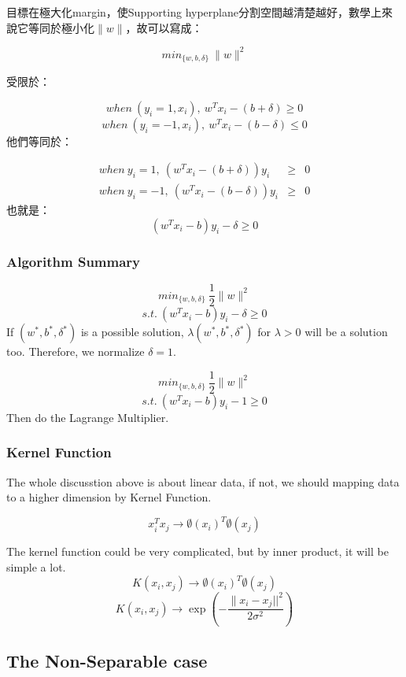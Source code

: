 \documentclass[]{book}
\begin{document}
目標在極大化margin，使Supporting hyperplane分割空間越清楚越好，數學上來說它等同於極小化\(\|w\|\)，故可以寫成：

\[min_{\{w,b,\delta\}}\ \|w\|^2\]

受限於：

\[when\ (y_i=1,x_i),\ w^Tx_i-(b+\delta)\geq 0\]
\[when\ (y_i=-1,x_i),\ w^Tx_i-(b-\delta)\leq 0\]
他們等同於：

\[\begin{eqnarray*}
when\ y_i=1,\ (w^{T}x_{i}-(b+\delta))y_{i} & \geq & 0\\
when\ y_i=-1,\ (w^{T}x_{i}-(b-\delta))y_{i} & \geq & 0
\end{eqnarray*}
\]
也就是：
\[(w^Tx_i-b)y_i-\delta \geq 0\]

\hypertarget{algorithm-summary}{%
\subsubsection{Algorithm Summary}\label{algorithm-summary}}

\[min_{\{w,b,\delta\}}\ \frac{1}{2}\|w\|^2\]
\[s.t.\ (w^Tx_i-b)y_i-\delta\geq 0\]
If \((w^*,b^*,\delta^*)\) is a possible solution, \(\lambda (w^*,b^*,\delta^*)\) for \(\lambda>0\) will be a solution too. Therefore, we normalize \(\delta=1\).

\[min_{\{w,b,\delta\}}\ \frac{1}{2}\|w\|^2\]
\[s.t.\ (w^Tx_i-b)y_i-1\geq 0\]
Then do the Lagrange Multiplier.

\hypertarget{kernel-function}{%
\subsubsection{Kernel Function}\label{kernel-function}}

The whole discusstion above is about linear data, if not, we should mapping data to a higher dimension by Kernel Function.

\[x_i^Tx_j\rightarrow\emptyset(x_i)^T\emptyset(x_j)\]

The kernel function could be very complicated, but by inner product, it will be simple a lot.
\[K(x_i,x_j)\rightarrow\emptyset(x_i)^T\emptyset(x_j)\]
\[K(x_i,x_j)\rightarrow\exp(-\frac{\|x_i-x_j||^2}{2\sigma^2})\]

\hypertarget{the-non-separable-case}{%
\subsection{The Non-Separable case}\label{the-non-separable-case}}
\end{document}
